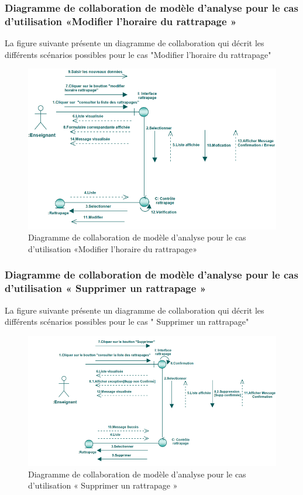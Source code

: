 \documentclass[12 pt]{report}
\begin{document}
\subsubsection{Diagramme  de  collaboration  de  modèle  d'analyse  pour  le  cas  d'utilisation «Modifier l'horaire du rattrapage »  }
La figure suivante présente un diagramme de collaboration qui décrit les différents
scénarios possibles pour le cas "Modifier l'horaire du rattrapage"
\begin{figure}[h]
\begin{center}
\includegraphics[width= 14 cm , height =5.5 cm]{colla_ens_modifierrattrapage.PNG}
 \caption{Diagramme  de  collaboration  de  modèle  d'analyse  pour  le  cas  d'utilisation «Modifier l'horaire du rattrapage»}
\end{center}
\end{figure} 
\subsubsection{Diagramme  de  collaboration  de  modèle  d'analyse  pour  le  cas  d'utilisation « Supprimer un rattrapage »  }
La figure suivante présente un diagramme de collaboration qui décrit les différents
scénarios possibles pour le cas " Supprimer un rattrapage"
\begin{figure}[h]
\begin{center}
\includegraphics[width= 14 cm , height =5.5 cm]{colla_ens_supprimerrattrapage.png}
 \caption{Diagramme  de  collaboration  de  modèle  d'analyse  pour  le  cas  d'utilisation « Supprimer un rattrapage »}
\end{center}
\end{figure} 
\end{document}
